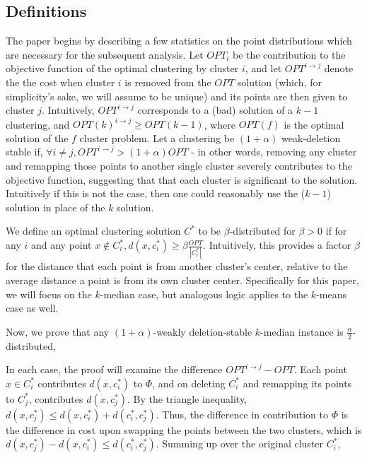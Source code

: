 \documentclass[paper=a4, fontsize=10.5pt]{scrartcl} %
\numberwithin{equation}{section} %
\numberwithin{figure}{section} %
\numberwithin{table}{section} %
\begin{document}
\subsection{Definitions}
The paper begins by describing a few statistics on the point distributions which are necessary for the subsequent analysis.  Let $OPT_i$ be the contribution to the objective function of the optimal clustering by cluster $i$, and let $OPT^{i \rightarrow j}$ denote the the cost when cluster $i$ is removed from the $OPT$ solution (which, for simplicity's sake, we will assume to be unique) and its points are then given to cluster $j$.  Intuitively, $OPT^{i \rightarrow j}$ corresponds to a (bad) solution of a $k-1$ clustering, and $OPT(k)^{i \rightarrow j} \geq OPT(k-1)$, where $OPT(f)$ is the optimal solution of the $f$ cluster problem.  Let a clustering be $(1 + \alpha)$ weak-deletion stable if, $\forall i \neq j, OPT^{i \rightarrow j} > (1 + \alpha)OPT$ - in other words, removing any cluster and remapping those points to another single cluster severely contributes to the objective function, suggesting that that each cluster is significant to the solution. Intuitively if this is not the case, then one could reasonably use the ($k-1$) solution in place of the $k$ solution.

  We define an optimal clustering solution $C^*$ to be $\beta$-distributed for $\beta > 0$ if for any $i$ and any point $x \notin C^*_i, d(x, c^*_i) \geq \beta \frac{OPT}{|C^*_i|}$. Intuitively, this provides a factor $\beta$ for the distance that each point is from another cluster's center, relative to the average distance a point is from its own cluster center. Specifically for this paper, we will focus on the $k$-median case, but analogous logic applies to the $k$-means case as well.   

Now, we prove that any $(1+\alpha)$-weakly deletion-stable $k$-median instance is $\frac{\alpha}{2}$-distributed,


In each case, the proof will examine the difference $OPT^{i \rightarrow j} - OPT$.  Each point $x \in C^*_i$ contributes $d(x, c^*_i)$ to $\Phi$, and on deleting $C^*_i$ and remapping its points to $C^*_j$, contributes $d(x, c^*_j)$.  By the triangle inequality, $d(x, c^*_j) \leq d(x, c^*_i) + d(c^*_i, c^*_j)$. Thus, the difference in contribution to $\Phi$ is the difference in cost upon swapping the points between the two clusters, which is $ d(x, c^*_j)  - d(x, c^*_i) \leq d(c^*_i, c^*_j)$.  Summing up over the original cluster $C^*_i$,
\end{document}

